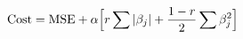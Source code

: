 \documentclass[preview]{standalone}
\begin{document}
\begin{align*}
\special{dvisvgm:raw <g id='unique000'>}\text{Cost} = \text{MSE} + \alpha \Big[r\sum|\beta_j| + \frac{1-r}{2}\sum\beta_j^2\Big]\special{dvisvgm:raw </g>}
\end{align*}
\end{document}
